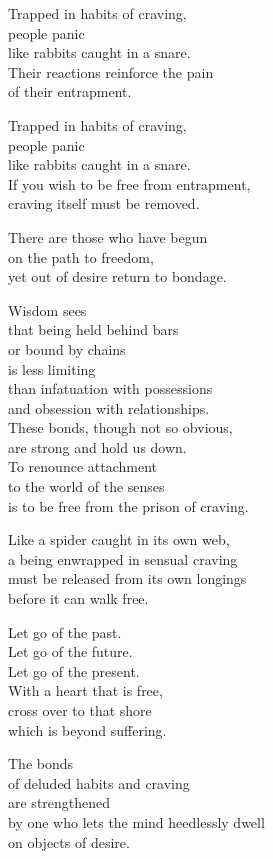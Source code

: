 Trapped in habits of craving,\\
people panic\\
like rabbits caught in a snare.\\
Their reactions reinforce the pain\\
of their entrapment.


Trapped in habits of craving,\\
people panic\\
like rabbits caught in a snare.\\
If you wish to be free from entrapment,\\
craving itself must be removed.


There are those who have begun\\
on the path to freedom,\\
yet out of desire return to bondage.


Wisdom sees\\
that being held behind bars\\
or bound by chains\\
is less limiting\\
than infatuation with possessions\\
and obsession with relationships.\\
These bonds, though not so obvious,\\
are strong and hold us down.\\
To renounce attachment\\
to the world of the senses\\
is to be free from the prison of craving.


Like a spider caught in its own web,\\
a being enwrapped in sensual craving\\
must be released from its own longings\\
before it can walk free.


Let go of the past.\\
Let go of the future.\\
Let go of the present.\\
With a heart that is free,\\
cross over to that shore\\
which is beyond suffering.


The bonds\\
of deluded habits and craving\\
are strengthened\\
by one who lets the mind heedlessly dwell\\
on objects of desire.


